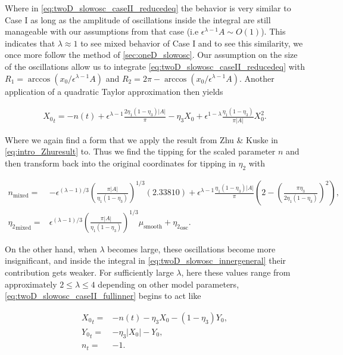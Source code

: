 Where in \eqref{eq:twoD_slowosc_caseII_reducedeq} the behavior is very similar to Case I as long as the amplitude of oscillations inside the integral are still manageable with our assumptions from that case (i.e $\epsilon^{\lambda-1}A \sim O(1)$). This indicates that $\lambda \approx 1$ to see mixed behavior of Case I and to see this similarity, we once more follow the method of \autoref{sec:oneD_slowosc}. Our assumption on the size of the oscillations allow us to integrate \eqref{eq:twoD_slowosc_caseII_reducedeq} with $R_1= \arccos(x_0/\epsilon^{\lambda-1}A)$ and $R_2 = 2\pi - \arccos(x_0/\epsilon^{\lambda-1}A)$. Another application of a quadratic Taylor approximation then yields

\begin{equation}\label{eq:twoD_slowosc_caseII_taylor}
\begin{aligned}
{X_0}_t = -n(t) +\epsilon^{\lambda-1}\frac{2\eta_1(1-\eta_3)|A|}{\pi}-\eta_3 X_0 +\epsilon^{1-\lambda}\frac{\eta_1(1-\eta_3)}{\pi |A|}X_0^2.
\end{aligned}
\end{equation}

Where we again find a form that we apply the result from Zhu \& Kuske in \eqref{eq:intro_Zhuresult} to. Thus we find the tipping for the scaled parameter $n$ and then transform back into the original coordinates for tipping in $\eta_2$ with

\begin{equation}
\begin{aligned}
n_{\text{mixed}}=&-\epsilon^{(\lambda-1)/3}\left(\frac{\pi|A|}{\eta_1(1-\eta_3)}\right)^{1/3}(2.33810)+\epsilon^{\lambda-1}\frac{\eta_1(1-\eta_3)|A|}{\pi}\left(2-\left(\frac{\pi\eta_3}{2\eta_1(1-\eta_3)}\right)^2\right),\\
{\eta_2}_{\text{mixed}}=& \epsilon^{(\lambda-1)/3}\left(\frac{\pi|A|}{\eta_1(1-\eta_3)}\right)^{1/3}\mu_{\text{smooth}}+{\eta_2}_{\text{osc}}.
\end{aligned}
\end{equation}

On the other hand, when $\lambda$ becomes large, these oscillations become more insignificant, and inside the integral in \eqref{eq:twoD_slowosc_innergeneral} their contribution gets weaker. For sufficiently large $\lambda$, here these values range from approximately $2\le\lambda \le 4$ depending on other model parameters, \eqref{eq:twoD_slowosc_caseII_fullinner} begins to act like

\begin{equation}\label{eq:twoD_slowosc_caseII_sloweq}
\begin{aligned}
{X_0}_t =& -n(t)-\eta_3 X_0 -(1-\eta_3)Y_0,\\
{Y_0}_t =&-\eta_3|X_0|-Y_0,\\
n_t  =&-1.
\end{aligned}
\end{equation}

